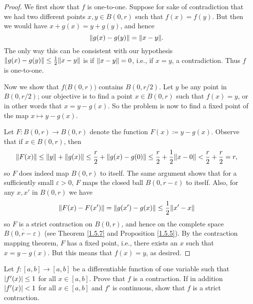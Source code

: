 \begin{proof}
    We first show that \(f\) is one-to-one.
    Suppose for sake of contradiction that we had two different points \(x, y \in B(0, r)\) such that \(f(x) = f(y)\).
    But then we would have \(x + g(x) = y + g(y)\), and hence
    \[
        \norm*{g(x) - g(y)} = \norm*{x - y}.
    \]
    The only way this can be consistent with our hypothesis \(\norm*{g(x) - g(y)} \leq \frac{1}{2} \norm*{x - y}\) is if \(\norm*{x - y} = 0\), i.e., if \(x = y\), a contradiction.
    Thus \(f\) is one-to-one.

    Now we show that \(f\big(B(0, r)\big)\) contains \(B(0, r / 2)\).
    Let \(y\) be any point in \(B(0, r / 2)\);
    our objective is to find a point \(x \in B(0, r)\) such that \(f(x) = y\), or in other words that \(x = y - g(x)\).
    So the problem is now to find a fixed point of the map \(x \mapsto y - g(x)\).

    Let \(F : B(0, r) \to B(0, r)\) denote the function \(F(x) \coloneqq y - g(x)\).
    Observe that if \(x \in B(0, r)\), then
    \[
        \norm*{F(x)} \leq \norm*{y} + \norm*{g(x)} \leq \frac{r}{2} + \norm*{g(x) - g(0)} \leq \frac{r}{2} + \frac{1}{2} \norm*{x - 0} < \frac{r}{2} + \frac{r}{2} = r,
    \]
    so \(F\) does indeed map \(B(0, r)\) to itself.
    The same argument shows that for a sufficiently small \(\varepsilon > 0\), \(F\) maps the closed ball \(\overline{B(0, r - \varepsilon)}\) to itself.
    Also, for any \(x, x'\) in \(B(0, r)\) we have
    \[
        \norm*{F(x) - F(x')} = \norm*{g(x') - g(x)} \leq \frac{1}{2} \norm*{x' - x}
    \]
    so \(F\) is a strict contraction on \(B(0, r)\), and hence on the complete space \(\overline{B(0, r - \varepsilon)}\) (see Theorem \ref{1.5.7} and Proposition \ref{1.5.5}).
    By the contraction mapping theorem, \(F\) has a fixed point, i.e., there exists an \(x\) such that \(x = y - g(x)\).
    But this means that \(f(x) = y\), as desired.
\end{proof}

\exercisesection

\begin{exercise}\label{ex 6.6.1}
    Let \(f : [a, b] \to [a, b]\) be a differentiable function of one variable such that \(\abs*{f'(x)} \leq 1\) for all \(x \in [a, b]\).
    Prove that \(f\) is a contraction.
    If in addition \(\abs*{f'(x)} < 1\) for all \(x \in [a, b]\) and \(f'\) is continuous, show that \(f\) is a strict contraction.
\end{exercise}

